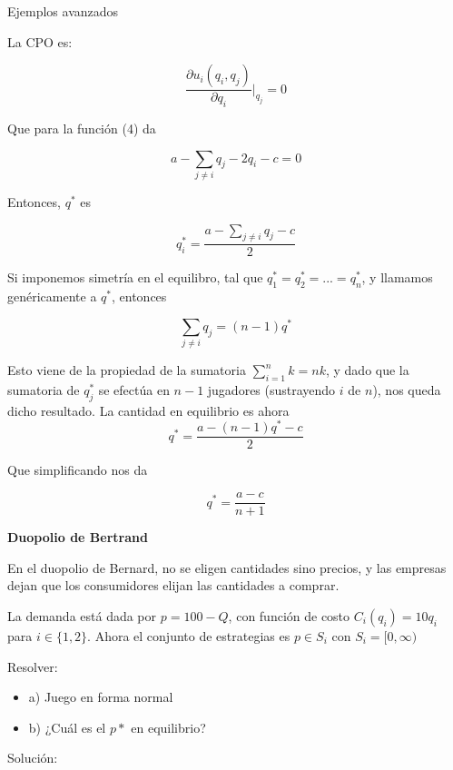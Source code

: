 \documentclass[12pt]{scrartcl}
\theoremstyle{definition}
\newenvironment{myitemize}
{ \begin{itemize}
		\setlength{\itemsep}{0pt}
		\setlength{\parskip}{0pt}
		\setlength{\parsep}{0pt}     }
	{ \end{itemize}                  }
\begin{document}
\begin{exbox}{Ejemplos avanzados}
\begin{myitemize}
        La CPO es:
        
        \[ \frac{\partial u_i(q_i, q_j)}{\partial q_i}\bigg|_{q_j} = 0 \]
        
        Que para la función (4) da
        
        \[ a - \sum_{j\neq i} q_j - 2q_i - c=0 \]
        
        Entonces, $q^*$ es
        
        \[ q_i^* = \frac{a - \sum\limits_{j\neq i}q_j - c}{2} \]
        
        Si imponemos simetría en el equilibro, tal que $q_1^* = q_2^* = ... = q_n^*$, y llamamos genéricamente a $q^*$, entonces 
        
        \[\sum_{j\neq i} q_j = (n-1)q^*\]
        
        Esto viene de la propiedad de la sumatoria $\sum_{i=1}^n k = nk$, y dado que la sumatoria de $q_j^*$ se efectúa en $n-1$ jugadores (sustrayendo $i$ de $n$), nos queda dicho resultado. La cantidad en equilibrio es ahora
        \[ q^* = \frac{a-(n-1)q^*-c}{2}\]
        
        Que simplificando nos da
        
        \[ q^* = \frac{a-c}{n+1} \]
   
    \end{myitemize}
    
    \textbf{Duopolio de Bertrand}
    
    En el duopolio de Bernard, no se eligen cantidades sino precios, y las empresas dejan que los consumidores elijan las cantidades a comprar. 
    
    La demanda está dada por $p=100 - Q$, con función de costo $C_i(q_i)=10q_i$ para $i\in \{1, 2\}$. Ahora el conjunto de estrategias es $p\in S_i$ con $S_i = [0, \infty)$
    
    Resolver:
    
    \begin{myitemize}
        \item[a)] Juego en forma normal
        \item[b)] ¿Cuál es el $p*$ en equilibrio?
    \end{myitemize}
    
    Solución:
    

\end{exbox}
\end{document}
